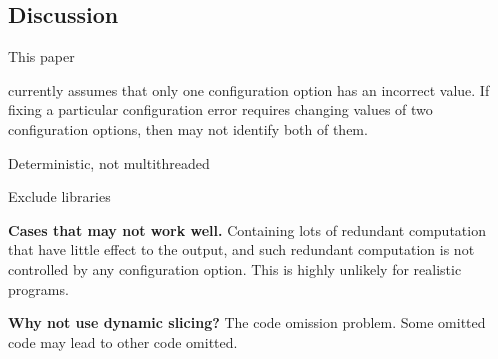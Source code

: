 

\subsection{Discussion}

This paper


\ourtool currently assumes that only one
configuration option has an incorrect value.
If fixing a particular configuration error
requires changing values of two configuration options,
then \ourtool may not identify both of them.


Deterministic, not multithreaded

Exclude libraries

\noindent \textbf{Cases that \ourtool may not work well.}
Containing lots of redundant computation that have
little effect to the output, and such redundant computation
is not controlled by any configuration option.
This is highly unlikely for realistic programs.

\noindent \textbf{Why not use dynamic slicing?} The code
omission problem. Some omitted code may lead to
other code omitted.
